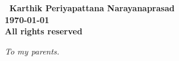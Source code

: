 \documentclass[oneside,12pt]{IIScthesisPSnPDF}
\newcommand{\blankpage}{
\newpage
\thispagestyle{empty}
\mbox{}
\newpage
}
\begin{document}
\vspace*{\fill}
\begin{center}
\large\bf \textcopyright \ Karthik Periyapattana Narayanaprasad\\
\large\bf \monthyeardate\today\\
\large\bf All rights reserved
\end{center}
\vspace*{\fill}
\thispagestyle{empty}

\blankpage

\vspace*{\fill}
\begin{center}
\large \it To my parents.
\end{center}

\vspace*{\fill}
\thispagestyle{empty}

\blankpage
%



\setcounter{secnumdepth}{5}
\setcounter{tocdepth}{3}

\frontmatter %


% 



\end{document}
